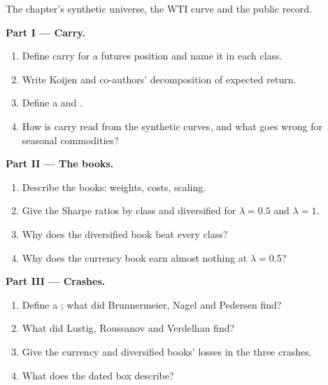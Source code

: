 \begin{problem}\label{pb:s1:carry-across-asset-classes:1}
The chapter's synthetic universe, the WTI curve and the public record.

\medskip\noindent\textbf{Part I --- Carry.}
\begin{enumerate}
\item Define carry for a futures position and name it in each class.
\item Write Koijen and co-authors' decomposition of expected return.
\item Define a  and .
\item How is carry read from the synthetic curves, and what goes wrong for seasonal commodities?
\end{enumerate}

\medskip\noindent\textbf{Part II --- The books.}
\begin{enumerate}[resume]
\item Describe the books: weights, costs, scaling.
\item Give the Sharpe ratios by class and diversified for $\lambda = 0.5$ and $\lambda = 1$.
\item Why does the diversified book beat every class?
\item Why does the currency book earn almost nothing at $\lambda = 0.5$?
\end{enumerate}

\medskip\noindent\textbf{Part III --- Crashes.}
\begin{enumerate}[resume]
\item Define a ; what did Brunnermeier, Nagel and Pedersen find?
\item What did Lustig, Roussanov and Verdelhan find?
\item Give the currency and diversified books' losses in the three crashes.
\item What does the dated box describe?
\end{enumerate}


\end{problem}
